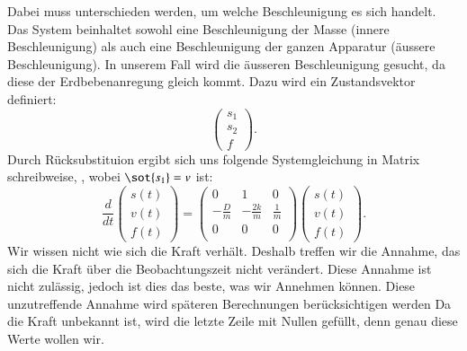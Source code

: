 Dabei muss unterschieden werden, um welche Beschleunigung es sich handelt.
Das System beinhaltet sowohl eine Beschleunigung der Masse (innere Beschleunigung) als auch eine Beschleunigung der ganzen Apparatur (äussere Beschleunigung). 
In unserem Fall wird die äusseren Beschleunigung gesucht, da diese der Erdbebenanregung gleich kommt.
Dazu wird ein Zustandsvektor definiert:
\[ 
 \left(\begin{array}{c} {s_1} \\ {s_2} \\ {f} \end{array}\right).
 \] 
Durch Rücksubstituion ergibt sich uns folgende Systemgleichung in Matrix schreibweise, , wobei $\sot {s_1}= v$ ist:
\begin{equation}
\frac{d}{dt} \left(\begin{array}{c} s(t) \\ v(t) \\ f(t) \end{array}\right) = \left(
 \begin{array}{ccc} 	
0 & 1& 0 \\ 
- \frac{D}{m} &-\frac{2k}{m} & \frac{1} {m}\\
0 & 0 & 0\\
\end{array}\right)  \left(\begin{array}{c} s(t)\\ v(t)\\ f(t) \end{array}\right).
\end{equation}
Wir wissen nicht wie sich die Kraft verhält. 
Deshalb treffen wir die Annahme, das sich die Kraft über die Beobachtungszeit nicht verändert.
Diese Annahme ist nicht zulässig, jedoch ist dies das beste, was wir Annehmen können. 
Diese unzutreffende Annahme wird späteren Berechnungen berücksichtigen werden
Da die Kraft unbekannt ist, wird die letzte Zeile mit Nullen gefüllt, denn genau diese Werte wollen wir. 











